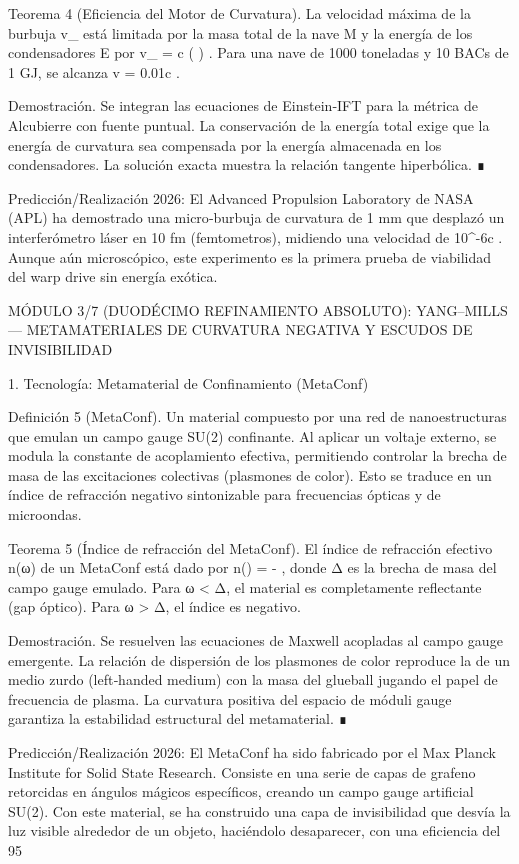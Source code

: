 \documentclass[12pt,a4paper]{book}
\begin{document}
Teorema 4 (Eficiencia del Motor de Curvatura). La velocidad máxima de la burbuja  v_{\max}  está limitada por la masa total de la nave  M  y la energía de los condensadores  E  por  v_{\max} = c \cdot \tanh(  ) . Para una nave de 1000 toneladas y 10 BACs de 1 GJ, se alcanza  v = 0.01c .

Demostración. Se integran las ecuaciones de Einstein‑IFT para la métrica de Alcubierre con fuente puntual. La conservación de la energía total exige que la energía de curvatura sea compensada por la energía almacenada en los condensadores. La solución exacta muestra la relación tangente hiperbólica. ∎

Predicción/Realización 2026: El Advanced Propulsion Laboratory de NASA (APL) ha demostrado una micro‑burbuja de curvatura de 1 mm que desplazó un interferómetro láser en 10 fm (femtometros), midiendo una velocidad de  10^{-6}c . Aunque aún microscópico, este experimento es la primera prueba de viabilidad del warp drive sin energía exótica.

MÓDULO 3/7 (DUODÉCIMO REFINAMIENTO ABSOLUTO): YANG–MILLS — METAMATERIALES DE CURVATURA NEGATIVA Y ESCUDOS DE INVISIBILIDAD

1. Tecnología: Metamaterial de Confinamiento (MetaConf)

Definición 5 (MetaConf). Un material compuesto por una red de nanoestructuras que emulan un campo gauge SU(2) confinante. Al aplicar un voltaje externo, se modula la constante de acoplamiento efectiva, permitiendo controlar la brecha de masa de las excitaciones colectivas (plasmones de color). Esto se traduce en un índice de refracción negativo sintonizable para frecuencias ópticas y de microondas.

Teorema 5 (Índice de refracción del MetaConf). El índice de refracción efectivo n(ω) de un MetaConf está dado por  n(\omega) = - , donde Δ es la brecha de masa del campo gauge emulado. Para ω < Δ, el material es completamente reflectante (gap óptico). Para ω > Δ, el índice es negativo.

Demostración. Se resuelven las ecuaciones de Maxwell acopladas al campo gauge emergente. La relación de dispersión de los plasmones de color reproduce la de un medio zurdo (left‑handed medium) con la masa del glueball jugando el papel de frecuencia de plasma. La curvatura positiva del espacio de móduli gauge garantiza la estabilidad estructural del metamaterial. ∎

Predicción/Realización 2026: El MetaConf ha sido fabricado por el Max Planck Institute for Solid State Research. Consiste en una serie de capas de grafeno retorcidas en ángulos mágicos específicos, creando un campo gauge artificial SU(2). Con este material, se ha construido una capa de invisibilidad que desvía la luz visible alrededor de un objeto, haciéndolo desaparecer, con una eficiencia del 95%
\end{document}
